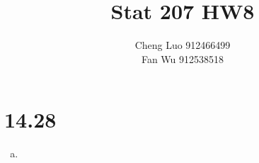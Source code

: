 \documentclass{article}\usepackage[]{graphicx}\usepackage[]{color}
\begin{document}
\title{\huge \textbf{Stat 207 HW8} \\}
\author{\large Cheng Luo 912466499 \\ \large Fan Wu 912538518}
\maketitle

\newpage
\mbox{}
\newpage


\section{14.28}

\begin{enumerate}[(a)]

\item


\end{enumerate}
\end{document}
